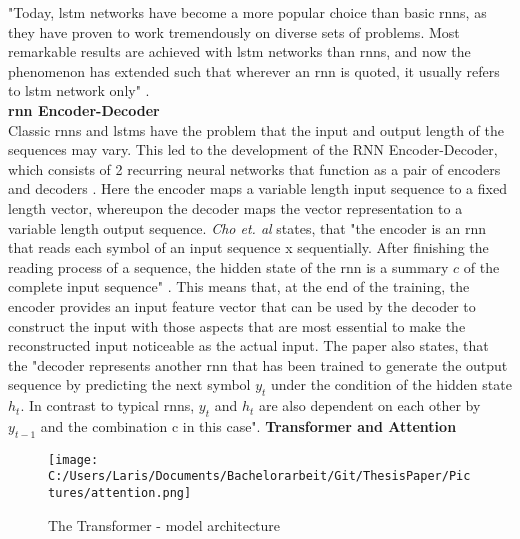 \documentclass[a4paper, 11pt,titlepage,oneside,openany]{book}
\begin{document}
\noindent "Today, \gls{lstm} networks have become a more popular choice than basic \gls{rnn}s, as they have proven to work tremendously on diverse sets of problems. Most remarkable results are achieved with \gls{lstm} networks than \gls{rnn}s, and now the phenomenon has extended such that wherever an \gls{rnn} is quoted, it usually refers to \gls{lstm} network only" \cite{rnn}.\\

\noindent \textbf{\gls{rnn} Encoder-Decoder} \\
\noindent Classic \gls{rnn}s and \gls{lstm}s have the problem that the input and output length of the sequences may vary. This led to the development of the RNN Encoder-Decoder, which consists of 2 recurring neural networks that function as a pair of encoders and decoders \cite{encodedecode}. Here the encoder maps a variable length input sequence to a fixed length vector, whereupon the decoder maps the vector representation to a variable length output sequence. \textit{Cho et. al} states, that "the encoder is an \gls{rnn} that reads each symbol of an input sequence x sequentially. After finishing the reading process of a sequence, the hidden state of the \gls{rnn} is a summary $c$ of the complete input sequence" \cite{encodedecode}. This means that, at the end of the training, the encoder provides an input feature vector that can be used by the decoder to construct the input with those aspects that are most essential to make the reconstructed input noticeable as the actual input. The paper also states, that the "decoder represents another \gls{rnn} that has been trained to generate the output sequence by predicting the next symbol $y_t$ under the condition of the hidden state $h_t$. In contrast to typical \gls{rnn}s, $y_t$ and $h_t$ are also dependent on each other by $y_{t-1}$ and the combination c in this case". 
\newpage
\noindent \textbf{Transformer and Attention} \\
\begin{figure}[h]
	\centering
	\texttt{[image: C:/Users/Laris/Documents/Bachelorarbeit/Git/ThesisPaper/Pictures/attention.png]}
	\caption{The Transformer - model architecture \cite{attention}}
\end{figure}\\
\end{document}
